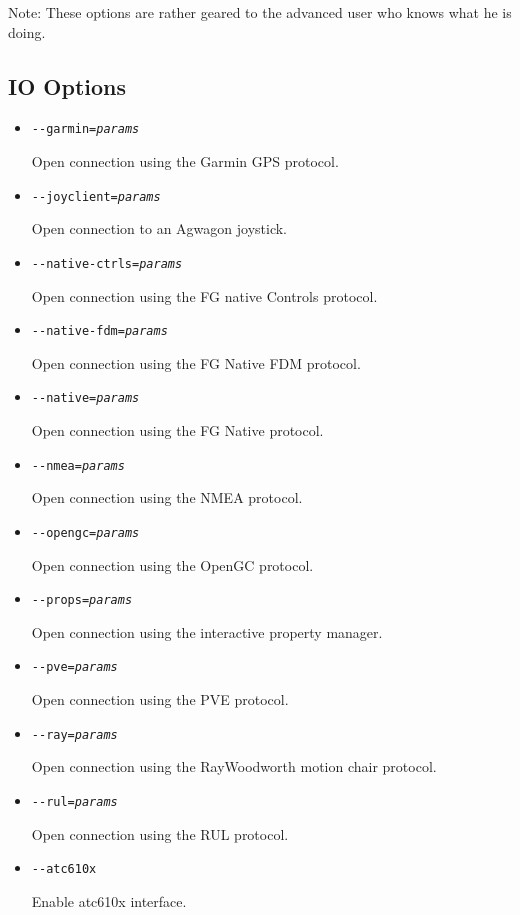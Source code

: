 Note: These options are rather geared to the advanced user who knows what he is doing. 

\subsection{IO Options}
\begin{itemize}
\item{\texttt{-$ $-garmin={\it params}}}

  Open connection using the Garmin GPS protocol.

\item{\texttt{-$ $-joyclient={\it params}}}

  Open connection to an Agwagon joystick.

\item{\texttt{-$ $-native-ctrls={\it params}}}

  Open connection using the FG native Controls protocol.

\item{\texttt{-$ $-native-fdm={\it params}}}

  Open connection using the FG Native FDM protocol.

\item{\texttt{-$ $-native={\it params}}}

  Open connection using the FG Native protocol.

\item{\texttt{-$ $-nmea={\it params}}}

  Open connection using the NMEA protocol.

\item{\texttt{-$ $-opengc={\it params}}}

  Open connection using the OpenGC protocol.

\item{\texttt{-$ $-props={\it params}}}

  Open connection using the interactive property manager.

\item{\texttt{-$ $-pve={\it params}}}

  Open connection using the PVE protocol.

\item{\texttt{-$ $-ray={\it params}}}

  Open connection using the RayWoodworth motion chair protocol.

\item{\texttt{-$ $-rul={\it params}}}

  Open connection using the RUL protocol.

\item{\texttt{-$ $-atc610x}}

  Enable atc610x interface.
\end{itemize}

